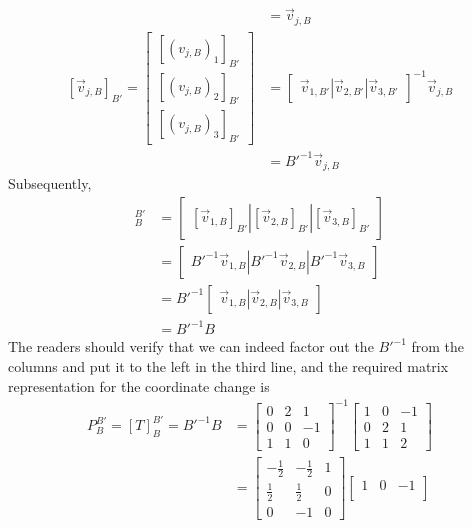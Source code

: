 \begin{solution}
\begin{align*}
&=
\vec{v}_{j,B} \\
[\vec{v}_{j,B}]_{B'} =
\begin{bmatrix}
[(v_{j,B})_1]_{B'} \\
[(v_{j,B})_2]_{B'} \\
[(v_{j,B})_3]_{B'}
\end{bmatrix}
&=
\begin{bmatrix}
\vec{v}_{1,B'} | \vec{v}_{2,B'} | \vec{v}_{3,B'}
\end{bmatrix}^{-1}
\vec{v}_{j,B} \\
&= B'^{-1}\vec{v}_{j,B}
\end{align*} 
Subsequently,
\begin{align*}
[T]_B^{B'} &= \begin{bmatrix}
[\vec{v}_{1,B}]_{B'} | [\vec{v}_{2,B}]_{B'} | [\vec{v}_{3,B}]_{B'}
\end{bmatrix} \\
&= \begin{bmatrix}
B'^{-1}\vec{v}_{1,B} | B'^{-1}\vec{v}_{2,B} | B'^{-1}\vec{v}_{3,B} 
\end{bmatrix} \\
&= B'^{-1}\begin{bmatrix}
\vec{v}_{1,B} | \vec{v}_{2,B} | \vec{v}_{3,B} 
\end{bmatrix} \\
&= B'^{-1}B
\end{align*}
The readers should verify that we can indeed factor out the $B'^{-1}$ from the columns and put it to the left in the third line, and the required matrix representation for the coordinate change is
\begin{align*}
P_B^{B'} = [T]_B^{B'} = B'^{-1}B &= 
\begin{bmatrix}
0 & 2 & 1 \\
0 & 0 & -1 \\
1 & 1 & 0
\end{bmatrix}^{-1}
\begin{bmatrix}
1 & 0 & -1\\
0 & 2 & 1 \\
1 & 1 & 2
\end{bmatrix} \\
&=
\begin{bmatrix}
-\frac{1}{2} & -\frac{1}{2} & 1 \\
\frac{1}{2} & \frac{1}{2} & 0 \\
0 & -1 & 0
\end{bmatrix}
\begin{bmatrix}
1 & 0 & -1\\

\end{bmatrix}
\end{align*}
\end{solution}
